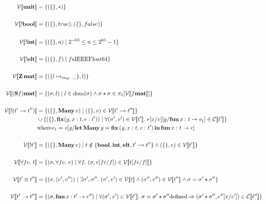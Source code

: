 \documentclass[11pt]{article}%
\newcommand{\den}[2]{ \mathcal{#1} [\![ #2 ]\!] }%
\newcommand{\V}[1]{ \den{V}{#1} }%
\newcommand{\C}[1]{ \den{C}{#1} }%
\newcommand{\Unit}{\ottkw{unit}}%
\newcommand{\Bang}{\ottkw{!}}
\newcommand{\Bool}{\ottkw{bool}}%
\newcommand{\Int}{\ottkw{int}}%
\newcommand{\Elt}{\ottkw{elt}}%
\newcommand{\Mat}{\ottkw{mat}}%
\newcommand{\Zf}{\ottkw{Z}}%
\newcommand{\Sf}{\ottkw{S}}%
\newcommand{\Many}{\ottkw{Many}}%
\newcommand{\dom}{\mathrm{dom}}%
\newcommand{\empH}{\{\}}%
\newcommand{\funEOne}{\ottkw{fun} \, \mathit{x}  \ottsym{:}  \ottnt{t}  \rightarrow  \ottnt{e_{{\mathrm{1}}}}}%
\newcommand{\eOneEq}{\ottnt{e_{{\mathrm{1}}}}  \ottsym{=}  \ottnt{e}  \ottsym{[}  \mathit{g}  \ottsym{/}  \ottkw{let} \, \ottkw{Many} \, \mathit{g}  \ottsym{=}  \ottkw{fix} \, \ottsym{(}  \mathit{g}  \ottsym{,}  \mathit{x}  \ottsym{:}  \ottnt{t}  \ottsym{,}  \ottnt{e}  \ottsym{:}  \ottnt{t'}  \ottsym{)} \, \ottkw{in} \, \ottkw{fun} \, \mathit{x}  \ottsym{:}  \ottnt{t}  \rightarrow  \ottnt{e}  \ottsym{]}}%
\begin{document}
%
\ottall%

\begin{align*}
  \V{ \Unit } &= \{ (\empH, \ast) \} \\
\\
    \V{ \Bang \Bool } &= \{ (\empH, true), (\empH, false) \} \\
\\
    \V{ \Bang \Int } &= \{ (\empH, n) \mid 2^{-63} \leq n \leq 2^{63} -1 \} \\
\\
    \V{ \Bang \Elt } &= \{ (\empH, f) \mid f \mathrm{ a IEEE Float64} \} \\
\\
    \V{ \Zf \, \Mat } &= \{ (\{ l \mapsto_{m_W} \_ \} , l) \} \\
\\
    \V{ (\Sf f) \Mat } &= \{ (\sigma , l) \mid l \in \dom(\sigma) \wedge \sigma \star \sigma \in \pi_1 [ \V{ f \ottkw{mat} } ] \} \\
\\
    \V{ \Bang (t' \multimap t'') } &= \{ (\empH, \Many\, v) \mid (\empH, v) \in \V{ t' \multimap t'' } \} \\
                                       & \cup \{ (\empH, \ottkw{fix} (g, x : t, e : t')) \mid \forall (\sigma', v') \in \V{ t' }.\ e [ x / v ] [ g / \funEOne ] \in \C{ t' } \} \\
                                       & \mathrm{where } \eOneEq  \\
\\
    \V{ \Bang t' } &= \{ (\empH, \Many\, v) \mid t \notin \{ \Bool, \Int, \Elt, t' \multimap t'' \} \wedge (\empH, v) \in \V{ t' } \} \\
\\
    \V{ \forall fc.\  t } &= \{ (\sigma, \forall fc.\ v) \mid \forall f.\ (\sigma, v [ fc / f ]) \in \V{ t [ fc / f ] } \} \\
\\
    \V{ t' \otimes t'' } &= \{ (\sigma, \langle v', v'' \rangle) \mid \exists \sigma', \sigma'' .\ (\sigma', v') \in \V{ t } \wedge (\sigma'', v'') \in \V{ t''} \wedge \sigma = \sigma' \star \sigma'' \} \\
\\
    \V{ t' \multimap t'' } &= \{ (\sigma, \ottkw{fun}\, x : t' \rightarrow e'') \mid \forall (\sigma', v') \in \V{ t' }.\ \sigma = \sigma' \star \sigma'' \mathrm{ defined } \Rightarrow (\sigma' \star \sigma'', e'' [ x / v' ]) \in \C{ t'' } \} \\
\\

\end{align*}
\end{document}
